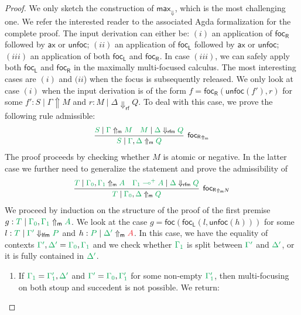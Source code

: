 \documentclass[runningheads]{llncs}
\newcommand{\ax}{\mathsf{ax}}
\newcommand{\lolli}{\multimap}
\newcommand{\lfm}{\dn_\mathsf{lfm}}%
\newcommand{\rfm}{\dn_\mathsf{rfm}}%
\newcommand{\rf}{\dn_\mathsf{rf}}%
\newcommand{\proofbox}[1]{\begin{tabular}{l} #1 \end{tabular}}
\newcommand{\red}[1]{{\color{Red}#1}}
\newcommand{\green}[1]{{\color{Green}#1}}
\newcommand{\up}{\Uparrow}
\newcommand{\dn}{\Downarrow}
\newcommand{\upm}{\Uparrow_{\mathsf{m}}}
\newcommand{\focL}{\mathsf{foc_L}}
\newcommand{\foc}{\mathsf{foc}}
\newcommand{\focR}{\mathsf{foc_R}}
\newcommand{\unfoc}{\mathsf{unfoc}}
\begin{document}
\begin{proof}
  We only sketch the construction of $\mathsf{max}_\dn$, which is the most challenging one. We refer the interested reader to the associated Agda formalization for the complete proof. The input derivation can either be: $(i)$ an application of $\focR$ followed by $\ax$ or $\unfoc$; $(ii)$ an application of $\focL$ followed by $\ax$ or $\unfoc$; $(iii)$ an application of both $\focL$ and $\focR$. In case $(iii)$, we can safely apply both $\focL$ and $\focR$ in the maximally multi-focused calculus. The most interesting cases are $(i)$ and $(ii$) when the focus is subsequently released. We only look at case $(i)$ when the input derivation is of the form $f = \focR(\unfoc(f'),r)$ for some $f' : S \mid \Gamma \up M$ and $r : M \mid \Delta \rf Q$. To deal with this case, we prove the following rule admissible:%
  \begin{equation*}\label{eq:otmax}
    \small
    \proofbox{
    \infer[\focR_{\upm}]{\green{S} \mid \green{\Gamma},\green{\Delta} \upm \green{Q}}{
      \green{S} \mid \green{\Gamma} \upm \green{M}
      &
      \green{M} \mid \green{\Delta} \rfm \green{Q}
    }
    }
  \end{equation*}
  The proof proceeds by checking whether $M$ is atomic or negative. In the latter case we further need to generalize the statement and prove the admissibility of
  \begin{equation*}\label{eq:otmaxneg}
    \small
    \proofbox{
    \infer[\focR_{\upm N}]{\green{T} \mid \green{\Gamma_0},\green{\Delta} \upm \green{Q}}{
      \green{T} \mid \green{\Gamma_0},\green{\Gamma_1} \upm \green{A}
      &
      \green{\green{\Gamma_1} \lolli^+ A} \mid \green{\Delta} \rfm \green{Q}
    }
    }
  \end{equation*}
  We proceed by induction on the structure of the proof of the first premise ${g : \green{T} \mid \green{\Gamma_0},\green{\Gamma_1} \upm \green{A}}$. We look at the case $g = \foc(\focL(l,\unfoc(h)))$ for some $l : \green{T} \mid \green{\Gamma'} \lfm \green{P}$ and $h : \green{P} \mid \green{\Delta'} \upm \red{A}$. In this case, we have the equality of contexts $\green{\Gamma'},\green{\Delta'} = \green{\Gamma_0},\green{\Gamma_1}$ and we check whether $\green{\Gamma_1}$ is split between $\green{\Gamma'}$ and $\green{\Delta'}$, or it is fully contained in $\green{\Delta'}$.
  \begin{enumerate}
  \item If $\green{\Gamma_1} = \green{\Gamma_{1}'},\green{\Delta'}$ and $\green{\Gamma'} =\green{\Gamma_0},\green{\Gamma_{1}'}$ for some non-empty $\green{\Gamma_{1}'}$, then multi-focusing on both stoup and succedent is not possible. We return:

\end{enumerate}
\end{proof}
\end{document}
